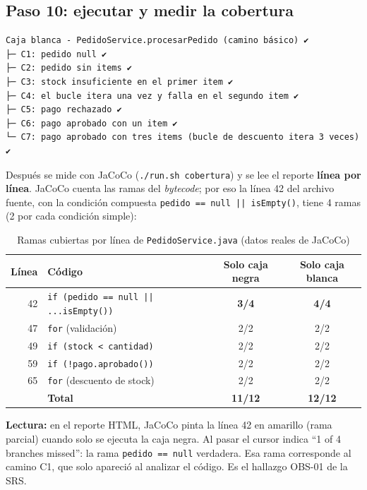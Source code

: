 \documentclass[11pt,a4paper,oneside]{report}
\newcommand{\code}[1]{\texttt{#1}}
\begin{document}
\subsection{Paso 10: ejecutar y medir la cobertura}
\begin{lstlisting}[style=bash,caption={Salida de la ejecución (ordenada)}]
Caja blanca - PedidoService.procesarPedido (camino básico) ✔
├─ C1: pedido null ✔
├─ C2: pedido sin items ✔
├─ C3: stock insuficiente en el primer item ✔
├─ C4: el bucle itera una vez y falla en el segundo item ✔
├─ C5: pago rechazado ✔
├─ C6: pago aprobado con un item ✔
└─ C7: pago aprobado con tres items (bucle de descuento itera 3 veces) ✔
\end{lstlisting}

Después se mide con JaCoCo (\code{./run.sh cobertura}) y se lee el reporte \textbf{línea por línea}. JaCoCo cuenta las ramas del \emph{bytecode}; por eso la línea 42 del archivo fuente, con la condición compuesta \code{pedido == null || isEmpty()}, tiene 4 ramas (2 por cada condición simple):

\begin{table}[H]
\centering
\caption{Ramas cubiertas por línea de \code{PedidoService.java} (datos reales de JaCoCo)}
\small
\begin{tabular}{rlcc}
\toprule
\textbf{Línea} & \textbf{Código} & \textbf{Solo caja negra} & \textbf{Solo caja blanca}\\
\midrule
42 & \code{if (pedido == null || ...isEmpty())} & \textcolor{anot}{\textbf{3/4}} & \textcolor{verde}{\textbf{4/4}}\\
47 & \code{for} (validación) & 2/2 & 2/2\\
49 & \code{if (stock < cantidad)} & 2/2 & 2/2\\
59 & \code{if (!pago.aprobado())} & 2/2 & 2/2\\
65 & \code{for} (descuento de stock) & 2/2 & 2/2\\
\midrule
& \textbf{Total} & \textbf{11/12} & \textbf{12/12}\\
\bottomrule
\end{tabular}
\end{table}

\textbf{Lectura:} en el reporte HTML, JaCoCo pinta la línea 42 en \textcolor{anot}{amarillo} (rama parcial) cuando solo se ejecuta la caja negra. Al pasar el cursor indica ``1 of 4 branches missed'': la rama \code{pedido == null} verdadera. Esa rama corresponde al camino C1, que solo apareció al analizar el código. Es el hallazgo OBS-01 de la SRS.
\end{document}
